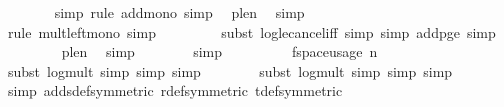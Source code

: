 \begin{isabellebody}
\ \ \ \ \ \ \isamarkupfalse%
\ {\isacharparenleft}{\kern0pt}simp{\isacharcomma}{\kern0pt}\ rule\ add{\isacharunderscore}{\kern0pt}mono{\isacharcomma}{\kern0pt}\ simp{\isacharparenright}{\kern0pt}\ \isamarkupfalse%
\ p{\isacharunderscore}{\kern0pt}le{\isacharunderscore}{\kern0pt}n\ \isamarkupfalse%
\ simp\isanewline
\ \ \ \ \ \ \isamarkupfalse%
\ {\isacharparenleft}{\kern0pt}rule\ mult{\isacharunderscore}{\kern0pt}left{\isacharunderscore}{\kern0pt}mono{\isacharcomma}{\kern0pt}\ simp{\isacharparenright}{\kern0pt}\isanewline
\ \ \ \ \ \ \ \isamarkupfalse%
\ {\isacharparenleft}{\kern0pt}subst\ log{\isacharunderscore}{\kern0pt}le{\isacharunderscore}{\kern0pt}cancel{\isacharunderscore}{\kern0pt}iff{\isacharcomma}{\kern0pt}\ simp{\isacharcomma}{\kern0pt}\ simp\ add{\isacharcolon}{\kern0pt}p{\isacharunderscore}{\kern0pt}ge{\isacharunderscore}{\kern0pt}{}{\isacharcomma}{\kern0pt}\ simp{\isacharparenright}{\kern0pt}\isanewline
\ \ \ \ \ \ \ \isamarkupfalse%
\ p{\isacharunderscore}{\kern0pt}le{\isacharunderscore}{\kern0pt}n\ \isamarkupfalse%
\ simp\isanewline
\ \ \ \ \ \ \isamarkupfalse%
\ simp\isanewline
\ \ \ \ \isamarkupfalse%
\ \isamarkupfalse%
\ {\isachardoublequoteopen}{\isachardot}{\kern0pt}{\isachardot}{\kern0pt}{\isachardot}{\kern0pt}\ {\isasymle}\ f{}{\isacharunderscore}{\kern0pt}space{\isacharunderscore}{\kern0pt}usage\ {\isacharparenleft}{\kern0pt}n{\isacharcomma}{\kern0pt}\ {\isasymepsilon}{\isacharcomma}{\kern0pt}\ {\isasymdelta}{\isacharparenright}{\kern0pt}{\isachardoublequoteclose}\isanewline
\ \ \ \ \ \ \isamarkupfalse%
\ {\isacharparenleft}{\kern0pt}subst\ log{\isacharunderscore}{\kern0pt}mult{\isacharcomma}{\kern0pt}\ simp{\isacharcomma}{\kern0pt}\ simp{\isacharcomma}{\kern0pt}\ simp{\isacharparenright}{\kern0pt}\isanewline
\ \ \ \ \ \ \isamarkupfalse%
\ {\isacharparenleft}{\kern0pt}subst\ log{\isacharunderscore}{\kern0pt}mult{\isacharcomma}{\kern0pt}\ simp{\isacharcomma}{\kern0pt}\ simp{\isacharcomma}{\kern0pt}\ simp{\isacharparenright}{\kern0pt}\isanewline
\ \ \ \ \ \ \isamarkupfalse%
\ {\isacharparenleft}{\kern0pt}simp\ add{\isacharcolon}{\kern0pt}s{\isacharunderscore}{\kern0pt}def{\isacharbrackleft}{\kern0pt}symmetric{\isacharbrackright}{\kern0pt}\ r{\isacharunderscore}{\kern0pt}def{\isacharbrackleft}{\kern0pt}symmetric{\isacharbrackright}{\kern0pt}\ t{\isacharunderscore}{\kern0pt}def{\isacharbrackleft}{\kern0pt}symmetric{\isacharbrackright}{\kern0pt}{\isacharparenright}{\kern0pt}\isanewline

\end{isabellebody}

